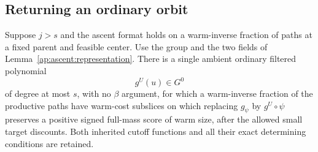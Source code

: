 \subsection{Returning an ordinary orbit}

\begin{proposition}
\label{ap:passive:replacement}
Suppose $j>s$ and the ascent format holds on a warm-inverse fraction
of paths at a fixed parent and feasible center.  Use the group and
the two fields of Lemma~\ref{ap:ascent:representation}.
There is a single ambient ordinary filtered polynomial
\[
                            g^U(u)\in G^0
\]
of degree at most $s$, with no $\beta$ argument, for which a
warm-inverse fraction of the productive paths have warm-cost
subslices on which replacing $g_\psi$ by $g^U\circ\psi$ preserves
a positive signed full-mass score of warm size, after the allowed
small target discounts.  Both inherited cutoff functions and all
their exact determining conditions are retained.
\end{proposition}

